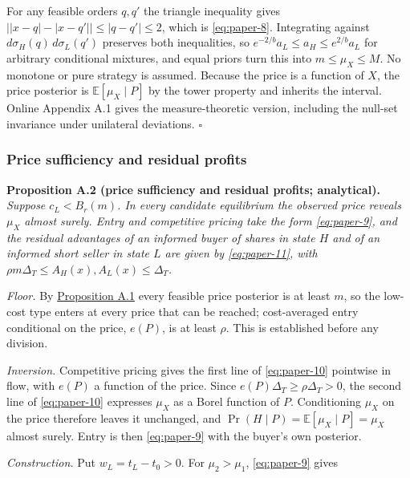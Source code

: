 \documentclass[
  12pt,
]{article}
\begin{document}
For any feasible orders \(q,q'\) the triangle inequality gives
\(\big||x-q|-|x-q'|\big|\le|q-q'|\le2\), which is \eqref{eq:paper-8}.
Integrating against \(d\sigma_H(q)\,d\sigma_L(q')\) preserves both
inequalities, so \(e^{-2/b}a_L\le a_H\le e^{2/b}a_L\) for arbitrary
conditional mixtures, and equal priors turn this into
\(m\le\mu_X\le M\). No monotone or pure strategy is assumed. Because the
price is a function of \(X\), the price posterior is
\(\mathbb E[\mu_X\mid P]\) by the tower property and inherits the
interval. Online Appendix A.1 gives the measure-theoretic version,
including the null-set invariance under unilateral deviations.
\(\square\)


\subsubsection{Price sufficiency and residual
profits}\label{price-sufficiency-and-residual-profits}

\protect{}\label{result-proposition-a-2}{\textbf{Proposition
A.2 (price sufficiency and residual profits; analytical).}}
\emph{Suppose \(c_L<B_r(m)\). In every candidate equilibrium the
observed price reveals \(\mu_X\) almost surely. Entry and competitive
pricing take the form \eqref{eq:paper-9}, and the residual advantages of
an informed buyer of shares in state \(H\) and of an informed short
seller in state \(L\) are given by \eqref{eq:paper-11}, with
\(\rho m\Delta_T\le A_H(x),A_L(x)\le\Delta_T\).}

\emph{Floor.} By \hyperref[result-proposition-a-1]{Proposition A.1}
every feasible price posterior is at least \(m\), so the low-cost type
enters at every price that can be reached; cost-averaged entry
conditional on the price, \(e(P)\), is at least \(\rho\). This is
established before any division.

\emph{Inversion.} Competitive pricing gives the first line of
\eqref{eq:paper-10} pointwise in flow, with \(e(P)\) a function of the
price. Since \(e(P)\Delta_T\ge\rho\Delta_T>0\), the second line of
\eqref{eq:paper-10} expresses \(\mu_X\) as a Borel function of \(P\).
Conditioning \(\mu_X\) on the price therefore leaves it unchanged, and
\(\Pr(H\mid P)=\mathbb E[\mu_X\mid P]=\mu_X\) almost surely. Entry is
then \eqref{eq:paper-9} with the buyer's own posterior.

\emph{Construction.} Put \(w_L=t_L-t_0>0\). For \(\mu_2>\mu_1\),
\eqref{eq:paper-9} gives
\end{document}
